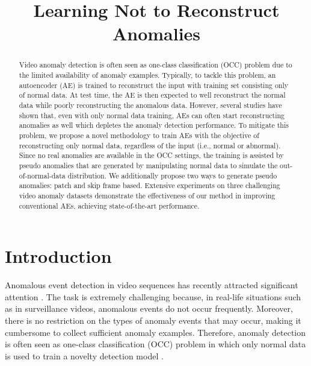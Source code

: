 \documentclass{bmvc2k}
\title{Learning Not to Reconstruct Anomalies}
\begin{document}
\maketitle
\begin{abstract}
Video anomaly detection is often seen as one-class classification (OCC) problem due to the limited availability of anomaly examples. Typically, to tackle this problem, an autoencoder (AE) is trained to reconstruct the input with training set consisting only of normal data. At test time, the AE is then expected to well reconstruct the normal data while poorly reconstructing the anomalous data. However, several studies have shown that, even with only normal data training, AEs can often start reconstructing anomalies as well which depletes the anomaly detection performance. To mitigate this problem, we propose a novel methodology to train AEs with the objective of reconstructing only normal data, regardless of the input (i.e., normal or abnormal). Since no real anomalies are available in the OCC settings, the training is assisted by pseudo anomalies that are generated by manipulating normal data to simulate the out-of-normal-data distribution. We additionally propose two ways to generate pseudo anomalies: patch and skip frame based. Extensive experiments on three challenging video anomaly datasets demonstrate the effectiveness of our method in improving conventional AEs, achieving state-of-the-art performance. 
\end{abstract}
\section{Introduction}
\label{sec:introduction}


Anomalous event detection in video sequences has recently attracted significant attention \cite{sultani2018real,zaheer2020claws,liu2018future,chang2020clustering,li2013anomaly,luo2017revisit,lu2013abnormal,abati2019latent,zhong2019graph}. The task is extremely challenging because, in real-life situations such as in surveillance videos, anomalous events do not occur frequently. Moreover, there is no restriction on the types of anomaly events that may occur, making it cumbersome to collect sufficient anomaly examples.
Therefore, anomaly detection is often seen as one-class classification (OCC) problem in which only normal data is used to train a novelty detection model \cite{gong2019memorizing,liu2018future,chang2020clustering,sabokrou2018adversarially,zaheer2020old,liu2008isolation,lee2012anomaly}. 
\end{document}
